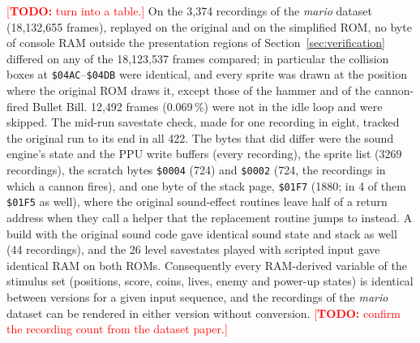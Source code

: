 \documentclass{article}
\newcommand{\TODO}[1]{\textcolor{red}{[\textbf{TODO:} #1]}}
\newcommand{\hex}[1]{\texttt{\$#1}}
\begin{document}
\TODO{turn into a table.} On the 3{,}374 recordings of the \textit{mario} dataset
(18{,}132{,}655 frames), replayed on the original and on the simplified ROM, no byte of console RAM
outside the presentation regions of Section~\ref{sec:verification} differed on any of the
18{,}123{,}537 frames compared; in particular the collision boxes at \hex{04AC}--\hex{04DB} were
identical, and every sprite was drawn at the position where the original ROM draws it, except
those of the hammer and of the cannon-fired Bullet Bill. 12{,}492 frames
(0.069\,\%) were not in the idle loop and were skipped. The mid-run savestate check,
made for one recording in eight, tracked the original run to its end in all 422. The
bytes that did differ were the sound engine's state and the PPU write buffers (every recording),
the sprite list (3269 recordings), the scratch bytes \hex{0004} (724) and
\hex{0002} (724, the recordings in which a cannon fires), and one byte of the stack page,
\hex{01F7} (1880; in 4 of them \hex{01F5} as well), where the original
sound-effect routines leave half of a return address when they call a helper that the
replacement routine jumps to instead. A build with the original sound code gave identical sound
state and stack as well (44 recordings), and the 26 level savestates played with scripted input
gave identical RAM on both ROMs. Consequently every RAM-derived variable of the stimulus set
(positions, score, coins, lives, enemy and power-up states) is identical between versions for a
given input sequence, and the recordings of the \textit{mario} dataset can be rendered in either
version without conversion. \TODO{confirm the recording count from the dataset paper.}
\end{document}

